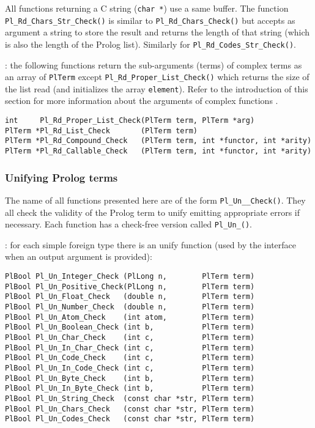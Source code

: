 All functions returning a C string (\texttt{char *}) use a same buffer. The
function \texttt{Pl\_Rd\_Chars\_Str\_Check()} is similar to
\texttt{Pl\_Rd\_Chars\_Check()} but accepts as argument a string to store the
result and returns the length of that string (which is also the length of
the Prolog list). Similarly for \texttt{Pl\_Rd\_Codes\_Str\_Check()}.

: the following functions return the sub-arguments
(terms) of complex terms as an array of \texttt{PlTerm} except
\texttt{Pl\_Rd\_Proper\_List\_Check()} which returns the size of the list read
(and initializes the array \texttt{element}). Refer to the introduction of
this section for more information about the arguments of complex functions
.

\begin{Indentation}
\begin{verbatim}
int     Pl_Rd_Proper_List_Check(PlTerm term, PlTerm *arg)
PlTerm *Pl_Rd_List_Check       (PlTerm term)
PlTerm *Pl_Rd_Compound_Check   (PlTerm term, int *functor, int *arity)
PlTerm *Pl_Rd_Callable_Check   (PlTerm term, int *functor, int *arity)
\end{verbatim}
\end{Indentation}

\subsubsection{Unifying Prolog terms}
The name of all functions presented here are of the form
\texttt{Pl\_Un\_\_Check()}. They all check the validity of the
Prolog term to unify emitting appropriate errors if necessary. Each function
has a check-free version called \texttt{Pl\_Un\_()}.

: for each simple foreign type
 there is an unify function (used by the
interface when an output argument is provided):

\begin{Indentation}
\begin{verbatim}
PlBool Pl_Un_Integer_Check (PlLong n,        PlTerm term)
PlBool Pl_Un_Positive_Check(PlLong n,        PlTerm term)
PlBool Pl_Un_Float_Check   (double n,        PlTerm term)
PlBool Pl_Un_Number_Check  (double n,        PlTerm term)
PlBool Pl_Un_Atom_Check    (int atom,        PlTerm term)
PlBool Pl_Un_Boolean_Check (int b,           PlTerm term)
PlBool Pl_Un_Char_Check    (int c,           PlTerm term)
PlBool Pl_Un_In_Char_Check (int c,           PlTerm term)
PlBool Pl_Un_Code_Check    (int c,           PlTerm term)
PlBool Pl_Un_In_Code_Check (int c,           PlTerm term)
PlBool Pl_Un_Byte_Check    (int b,           PlTerm term)
PlBool Pl_Un_In_Byte_Check (int b,           PlTerm term)
PlBool Pl_Un_String_Check  (const char *str, PlTerm term)
PlBool Pl_Un_Chars_Check   (const char *str, PlTerm term)
PlBool Pl_Un_Codes_Check   (const char *str, PlTerm term)
\end{verbatim}
\end{Indentation}


